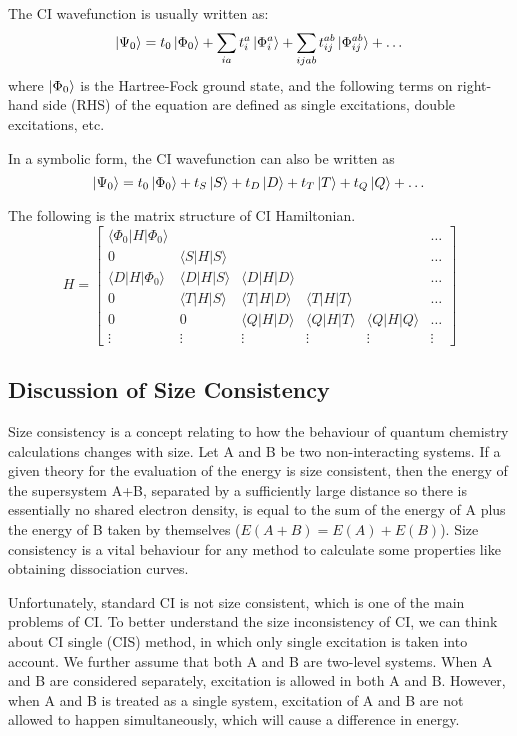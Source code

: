 The CI wavefunction is usually written as:
$$
\ket{\Psi_0}=t_0 \ket{\Phi_0} + \sum_{ia} t^{a}_{i}\ket{\Phi^{a}_{i}}+\sum_{ijab}t^{ab}_{ij}\ket{\Phi^{ab}_{ij}}+ \dots
$$
where $\ket{\Phi_0}$ is the Hartree-Fock ground state, and the following terms on right-hand side (RHS) of the equation are defined as single excitations, double excitations, etc.

In a symbolic form, the CI wavefunction can also be written as
\begin{equation} \label{CIexcite}
	\ket{\Psi_0}=t_0\ket{\Phi_0}+t_S\ket{S}+t_D\ket{D}+t_T\ket{T}+t_Q\ket{Q}+\dots
\end{equation}

The following is the matrix structure of CI Hamiltonian.
$$
H=
\left[ 
\begin{array}{cccccc}
	\langle\Phi_{0}|H| \Phi_{0} \rangle & & & & & \dots
	\\ 
	0 & \langle S|H| S\rangle & & & & \dots
	\\
	\langle D|H| \Phi_{0} \rangle & \langle D|H| S\rangle & \langle D|H| D\rangle & & & \dots
	\\
	0 & \langle T|H| S\rangle & \langle T|H| D\rangle & \langle T|H| T\rangle & & \dots
	\\
	0 & 0 & \langle Q|H| D\rangle & \langle Q|H| T\rangle & \langle Q|H| Q\rangle & \dots
	\\
	{\vdots} & {\vdots} & {\vdots} & {\vdots} & {\vdots} & {\vdots}
\end{array}
\right]
$$

\subsection{Discussion of Size Consistency}
Size consistency is a concept relating to how the behaviour of quantum chemistry calculations changes with size. \cite{sizeconsistency}
Let A and B be two non-interacting systems.
If a given theory for the evaluation of the energy is size consistent, then the energy of the supersystem A+B, separated by a sufficiently large distance so there is essentially no shared electron density, is equal to the sum of the energy of A plus the energy of B taken by themselves ($E(A+B)=E(A)+E(B)$).
Size consistency is a vital behaviour for any method to calculate some properties like obtaining dissociation curves.

Unfortunately, standard CI is not size consistent, which is one of the main problems of CI.
To better understand the size inconsistency of CI, we can think about CI single (CIS) method, in which only single excitation is taken into account.
We further assume that both A and B are two-level systems.
When A and B are considered separately, excitation is allowed in both A and B.
However, when A and B is treated as a single system, excitation of A and B are not allowed to happen simultaneously, which will cause a difference in energy.

